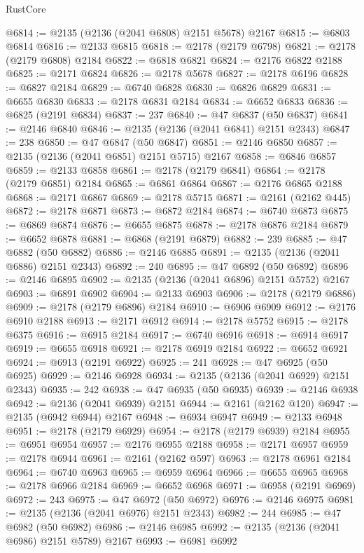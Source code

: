 \begin{lexlean}{RustCore}
\begin{coremodule}
@6814 := @2135 (@2136 (@2041 @6808) @2151 @5678) @2167
@6815 := @6803 @6814
@6816 := @2133 @6815
@6818 := @2178 (@2179 @6798)
@6821 := @2178 (@2179 @6808) @2184
@6822 := @6818 @6821
@6824 := @2176 @6822 @2188
@6825 := @2171 @6824
@6826 := @2178 @5678
@6827 := @2178 @6196
@6828 := @6827 @2184
@6829 := @6740 @6828
@6830 := @6826 @6829
@6831 := @6655 @6830
@6833 := @2178 @6831 @2184
@6834 := @6652 @6833
@6836 := @6825 (@2191 @6834)
@6837 := 237
@6840 := @47 @6837 (@50 @6837)
@6841 := @2146 @6840
@6846 := @2135 (@2136 (@2041 @6841) @2151 @2343)
@6847 := 238
@6850 := @47 @6847 (@50 @6847)
@6851 := @2146 @6850
@6857 := @2135 (@2136 (@2041 @6851) @2151 @5715) @2167
@6858 := @6846 @6857
@6859 := @2133 @6858
@6861 := @2178 (@2179 @6841)
@6864 := @2178 (@2179 @6851) @2184
@6865 := @6861 @6864
@6867 := @2176 @6865 @2188
@6868 := @2171 @6867
@6869 := @2178 @5715
@6871 := @2161 (@2162 @445)
@6872 := @2178 @6871
@6873 := @6872 @2184
@6874 := @6740 @6873
@6875 := @6869 @6874
@6876 := @6655 @6875
@6878 := @2178 @6876 @2184
@6879 := @6652 @6878
@6881 := @6868 (@2191 @6879)
@6882 := 239
@6885 := @47 @6882 (@50 @6882)
@6886 := @2146 @6885
@6891 := @2135 (@2136 (@2041 @6886) @2151 @2343)
@6892 := 240
@6895 := @47 @6892 (@50 @6892)
@6896 := @2146 @6895
@6902 := @2135 (@2136 (@2041 @6896) @2151 @5752) @2167
@6903 := @6891 @6902
@6904 := @2133 @6903
@6906 := @2178 (@2179 @6886)
@6909 := @2178 (@2179 @6896) @2184
@6910 := @6906 @6909
@6912 := @2176 @6910 @2188
@6913 := @2171 @6912
@6914 := @2178 @5752
@6915 := @2178 @6375
@6916 := @6915 @2184
@6917 := @6740 @6916
@6918 := @6914 @6917
@6919 := @6655 @6918
@6921 := @2178 @6919 @2184
@6922 := @6652 @6921
@6924 := @6913 (@2191 @6922)
@6925 := 241
@6928 := @47 @6925 (@50 @6925)
@6929 := @2146 @6928
@6934 := @2135 (@2136 (@2041 @6929) @2151 @2343)
@6935 := 242
@6938 := @47 @6935 (@50 @6935)
@6939 := @2146 @6938
@6942 := @2136 (@2041 @6939) @2151
@6944 := @2161 (@2162 @120)
@6947 := @2135 (@6942 @6944) @2167
@6948 := @6934 @6947
@6949 := @2133 @6948
@6951 := @2178 (@2179 @6929)
@6954 := @2178 (@2179 @6939) @2184
@6955 := @6951 @6954
@6957 := @2176 @6955 @2188
@6958 := @2171 @6957
@6959 := @2178 @6944
@6961 := @2161 (@2162 @597)
@6963 := @2178 @6961 @2184
@6964 := @6740 @6963
@6965 := @6959 @6964
@6966 := @6655 @6965
@6968 := @2178 @6966 @2184
@6969 := @6652 @6968
@6971 := @6958 (@2191 @6969)
@6972 := 243
@6975 := @47 @6972 (@50 @6972)
@6976 := @2146 @6975
@6981 := @2135 (@2136 (@2041 @6976) @2151 @2343)
@6982 := 244
@6985 := @47 @6982 (@50 @6982)
@6986 := @2146 @6985
@6992 := @2135 (@2136 (@2041 @6986) @2151 @5789) @2167
@6993 := @6981 @6992

\end{coremodule}
\end{lexlean}
